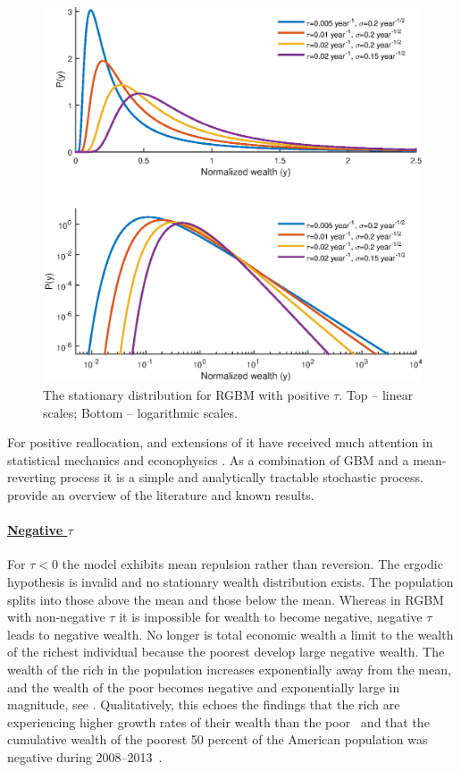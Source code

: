 \begin{figure}[!htb]
\centering
\includegraphics[width=1.0\textwidth] {./chapter_3/figs/dists.eps}
\caption{The stationary distribution for RGBM with positive $\tau$. Top -- linear scales; Bottom -- logarithmic scales.}
\end{figure}

For positive reallocation,  and extensions of it have received much attention in statistical mechanics and econophysics \cite{BouchaudMezard2000,Bouchaud2015}. As a combination of GBM and a mean-reverting process it is a simple and analytically tractable stochastic process. \cite{LiuSerota2016} provide an overview of the literature and known results.

\paragraph{\underline{Negative $\tau$}}
\mbox{}

For $\tau<0$ the model exhibits mean repulsion rather than reversion. The ergodic hypothesis is invalid and no stationary wealth distribution exists. The population splits into those above the mean and those below the mean. Whereas in RGBM with non-negative $\tau$ it is impossible for wealth to become negative, negative $\tau$ leads to negative wealth. No longer is total economic wealth a limit to the wealth of the richest individual because the poorest develop large negative wealth. The wealth of the rich in the population increases exponentially away from the mean, and the wealth of the poor becomes negative and exponentially large in magnitude, see . Qualitatively, this echoes the findings that the rich are experiencing higher growth rates of their wealth than the poor~\cite{Piketty2014,wolff2014household} and that the cumulative wealth of the poorest 50 percent of the American population was negative during 2008--2013~\cite{Rios20162013,WID2017}.

